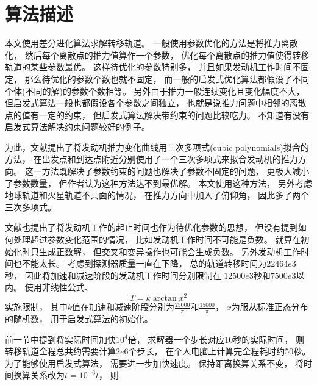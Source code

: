 \section{算法描述}
本文使用差分进化算法\cite{jqingfeng2017}求解转移轨道。
一般使用参数优化的方法是将推力离散化，
然后每个离散点的推力值算作一个参数，
优化每个离散点的推力值使得转移轨道的某些参数最优。
这样待优化的参数特别多\cite{dchengxing2011}，
并且如果发动机工作时间不固定，
那么待优化的参数个数也就不固定，
而一般的启发式优化算法都假设了不同个体(不同的解)的参数个数相等。
另外由于推力一般连续变化且变化幅度不大，
但启发式算法一般也都假设各个参数之间独立，
也就是说推力问题中相邻的离散点的值有一定的约束，
但启发式算法解决带约束的问题比较吃力。
不知道有没有启发式算法解决约束问题较好的例子。

为此，文献\cite{jbradley2005}提出了将发动机推力变化曲线用三次多项式(cubic polynomials)拟合的方法，
在出发点和到达点附近分别使用了一个三次多项式来拟合发动机的推力方向。
这一方法既解决了参数约束的问题也解决了参数不固定的问题，
更极大减小了参数数量，
但作者认为这种方法达不到最优解。
本文使用这种方法，
另外考虑地球轨道和火星轨道不共面的情况，
在推力方向中加入了俯仰角，
因此多了两个三次多项式。

文献\cite{jbradley2005}也提出了将发动机工作的起止时间也作为待优化参数的思想，
但没有提到如何处理超过参数变化范围的情况，
比如发动机工作时间不可能是负数。
就算在初始化时只生成正数解，
但交叉和变异操作也可能会生成负数。
另外发动机工作时间也不能太长。
考虑到探测器质量一直在下降，
总的轨道转移时间为$22464e3$秒，
因此将加速和减速阶段的发动机工作时间分别限制在
$12500e3$秒和$7500e3$以内。
使用非线性公式、
\[T=k\arctan{x}^2\]
实施限制，
其中$k$值在加速和减速阶段分别为$\frac{25000}{\pi}$和$\frac{15000}{\pi}$，
$x$为服从标准正态分布的随机数，
用于启发式算法的初始化。

前一节中提到将实际时间加快$10^4$倍，
求解器一个步长对应10秒的实际时间，
则转移轨道全程总共约需要计算$2e6$个步长，
在个人电脑上计算完全程耗时约50秒。
为了能够使用启发式算法，
需要进一步加快速度。
保持距离换算关系不变，
将时间换算关系改为$\bar{t}=10^{-6}t$，
则
